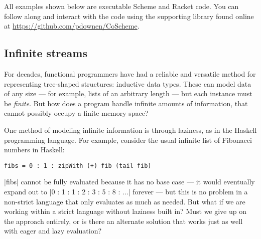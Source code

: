 All examples shown below are executable Scheme and Racket code.
You can follow along and interact with the code using the supporting library found online at \url{https://github.com/pdownen/CoScheme}.

\subsection{Infinite streams}


For decades, functional programmers have had a reliable and versatile method for representing tree-shaped structures: inductive data types.
These can model data of any size --- for example, lists of an arbitrary length --- but each instance must be \emph{finite}.
But how does a program handle infinite amounts of information, that cannot possibly occupy a finite memory space?

One method of modeling infinite information is through laziness, as in the Haskell programming language.
For example, consider the usual infinite list of Fibonacci numbers in Haskell:
\begin{verbatim}
fibs = 0 : 1 : zipWith (+) fib (tail fib)
\end{verbatim}
\hs|fibs| cannot be fully evaluated because it has no base case --- it would eventually expand out to \hs|0 : 1 : 1 : 2 : 3 : 5 : 8 : ...| forever --- but this is no problem in a non-strict language that only evaluates as much as needed.
But what if we are working within a strict language without laziness built in?
Must we give up on the approach entirely, or is there an alternate solution that works just as well with eager and lazy evaluation?

